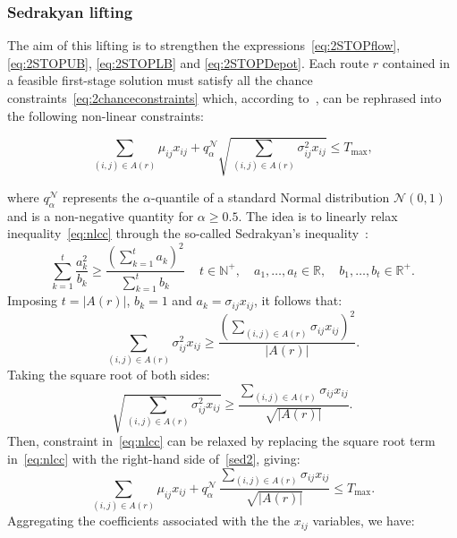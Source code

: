 \documentclass[11pt]{article}
\theoremstyle{definition}
\begin{document}
\subsubsection{Sedrakyan lifting}
The aim of this lifting is to strengthen the expressions~\eqref{eq:2STOPflow}, \eqref{eq:2STOPUB}, \eqref{eq:2STOPLB} and \eqref{eq:2STOPDepot}. Each route $r$ contained in a feasible first-stage solution must satisfy all the chance constraints~\eqref{eq:2chanceconstraints} which, according to~\cite{Hillier1967}, can be rephrased into the following non-linear constraints:

\begin{equation}
	\sum_{(i,j) \in A(r)} \mu_{ij} x_{ij} + q^{\mathcal{N}}_{\alpha} \sqrt{\sum_{(i,j) \in A(r)} \sigma^2_{ij} x_{ij}} \leq T_{\max},
	\label{eq:nlcc}
\end{equation}

where $q^{\mathcal{N}}_{\alpha}$ represents the $\alpha$-quantile of a standard Normal distribution $\mathcal{N}(0, 1)$ and is a non-negative quantity for $\alpha \geq 0.5$. The idea is to linearly relax inequality~\eqref{eq:nlcc} through the so-called Sedrakyan's inequality~\citep{Sedrakyan2018}:
%
\begin{equation*}
	\sum_{k=1}^t \frac{a_k^2}{b_k} \geq \frac{\left(\sum\limits_{k=1}^t a_k\right)^2}{\sum\limits_{k=1}^t b_k} \quad \, t \in \mathbb{N}^+, \quad a_1, \ldots, a_t \in \mathbb{R}, \quad b_1, \ldots, b_t \in \mathbb{R}^+.
\end{equation*}
%
Imposing $t = |A(r)|$, $b_k = 1$ and $a_k = \sigma_{ij} x_{ij}$, it follows that:
%
\begin{equation}
	\sum_{(i,j) \in A(r)} \sigma^2_{ij} x_{ij} \geq \frac{\left(\sum\limits_{(i,j) \in A(r)} \sigma_{ij} x_{ij}\right)^2}{|A(r)|}.
  \label{sed1}
\end{equation}
%
Taking the square root of both sides:
%
\begin{equation}
	\sqrt{\sum_{(i,j) \in A(r)} \sigma^2_{ij} x_{ij}} \geq \frac{\sum\limits_{(i,j) \in A(r)} \sigma_{ij} x_{ij}}{\sqrt{|A(r)|}}.
  \label{sed2}
\end{equation}
%
Then, constraint in~\eqref{eq:nlcc} can be relaxed by replacing the square root term in~\eqref{eq:nlcc} with the right-hand side of~\eqref{sed2}, giving:
%
\begin{equation*}
	\sum_{(i,j) \in A(r)} \mu_{ij} x_{ij} + q^{\mathcal{N}}_{\alpha} \, \frac{\sum\limits_{(i,j) \in A(r)} \sigma_{ij} x_{ij}}{\sqrt{|A(r)|}} \leq T_{\max}.
\end{equation*}
%
%
Aggregating the coefficients associated with the the $x_{ij}$ variables, we have:
\end{document}
